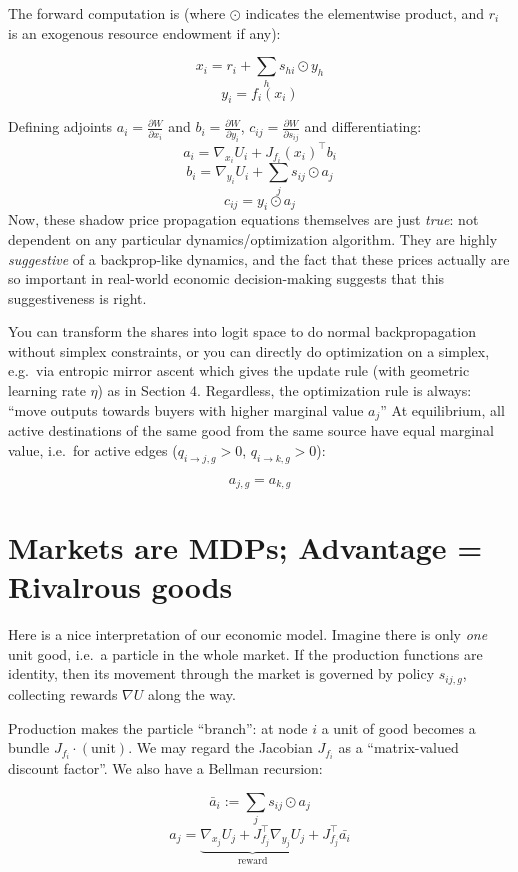 The forward computation is (where \(\odot\) indicates the elementwise product, and \(r_i\) is an exogenous resource endowment if any):

\[x_i = r_i+\sum_h s_{hi}\odot y_h\] \[y_i=f_i(x_i)\]

Defining adjoints \(a_i=\frac{\partial W}{\partial x_i}\) and \(b_i=\frac{\partial W}{\partial y_i}\), \(c_{ij}=\frac{\partial W}{\partial s_{ij}}\) and differentiating: \[
a_i=\nabla_{x_i}U_i+J_{f_i}(x_i)^\top b_i\tag{1.2}\] \[b_i=\nabla_{y_i}U_i+\sum_j s_{ij}\odot a_j\tag{1.3}\]\[c_{ij} = y_i\odot a_j\tag{1.4}\] Now, these shadow price propagation equations themselves are just \emph{true}: not dependent on any particular dynamics/optimization algorithm. They are highly \emph{suggestive} of a backprop-like dynamics, and the fact that these prices actually are so important in real-world economic decision-making suggests that this suggestiveness is right.

You can transform the shares into logit space to do normal backpropagation without simplex constraints, or you can directly do optimization on a simplex, e.g.~via entropic mirror ascent which gives the update rule (with geometric learning rate \(\eta\)) as in Section 4. Regardless, the optimization rule is always: ``move outputs towards buyers with higher marginal value \(a_j\)'' At equilibrium, all active destinations of the same good from the same source have equal marginal value, i.e.~for active edges (\(q_{i\to j,g}>0\), \(q_{i\to k,g}>0\)):

\[a_{j,g}=a_{k,g}\]

\section{Markets are MDPs; Advantage = Rivalrous goods}
\label{sec:markets-are-mdps}

Here is a nice interpretation of our economic model. Imagine there is only \emph{one} unit good, i.e.~a particle in the whole market. If the production functions are identity, then its movement through the market is governed by policy \(s_{ij,g}\), collecting rewards \(\nabla U\) along the way.

Production makes the particle ``branch'': at node \(i\) a unit of good becomes a bundle \(J_{f_i} \cdot (\text{unit})\). We may regard the Jacobian \(J_{f_i}\) as a ``matrix-valued discount factor''. We also have a Bellman recursion:

\[\bar a_{i} := \sum_j s_{ij}\odot a_{j}\tag{2.1}\] \[a_j = \underbrace{\nabla_{x_j} U_j+ J_{f_j}^\top\nabla_{y_j} U_j}_{\text{reward}} + J_{f_j}^\top \bar{a_i} \tag{2.2}\]

